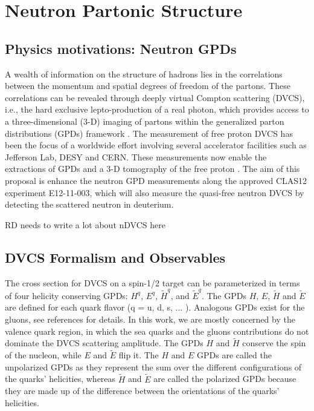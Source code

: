 \chapter{Neutron Partonic Structure}
\label{chap:physics}

\section{Physics motivations: Neutron GPDs}

A wealth of information on the structure of hadrons lies in the correlations 
between the momentum and spatial degrees of freedom of the partons. These 
correlations can be revealed through deeply virtual Compton scattering (DVCS), 
i.e., the hard exclusive lepto-production of a real photon, which provides 
access to a three-dimensional (3-D) imaging of partons within the generalized 
parton distributions (GPDs) framework 
\cite{Mueller:1998fv,PhysRevLett.78.610,PhysRevD.55.7114,Radyushkin:1996nd,PhysRevD.56.5524}.   
The measurement of free proton DVCS has been the focus of a worldwide effort 
\cite{PhysRevLett.87.182002,
   PhysRevLett.87.182001,
   PhysRevD.75.011103,
   Girod:2007aa,
   PhysRevC.92.055202,
   PhysRevLett.99.242501,
   PhysRevC.80.035206,
   PhysRevLett.114.032001,
   Jo:2015ema}
involving several accelerator facilities such as Jefferson Lab, DESY and  
CERN. These measurements now enable the extractions of GPDs and a 3-D 
tomography of the free proton \cite{Guidal:2013rya, PhysRevD.95.011501}. The 
aim of this proposal is enhance the neutron GPD measurements along the approved 
CLAS12 experiment E12-11-003, which will also measure the quasi-free neutron 
DVCS by detecting the scattered neutron in deuterium.  

RD needs to write a lot about nDVCS here

\section{DVCS Formalism and Observables}

The cross section for DVCS on a spin-1/2 target can be parameterized in terms 
of four helicity conserving GPDs: $H^q$, $E^q$, $\tilde{H}^q$, and 
$\tilde{E}^q$. The GPDs $H$, $E$, $\widetilde{H}$ and $\widetilde{E}$ are 
defined for each quark flavor (q = u, d, s, ... ). Analogous GPDs exist for the 
gluons, see references \cite{PhysRevLett.78.610,PhysRevD.56.5524,Goeke:2001tz} for details.  In 
this work, we are mostly concerned by the valence quark region, in which the 
sea quarks and the gluons contributions do not dominate the DVCS scattering 
amplitude. The GPDs $H$ and $\widetilde{H}$ conserve the spin of the nucleon, 
while $E$ and $\widetilde{E}$ flip it. The $H$ and $E$ GPDs are called the 
unpolarized GPDs as they represent the sum over the different configurations of 
the quarks' helicities, whereas $\widetilde{H}$ and $\widetilde{E}$ are called 
the polarized GPDs because they are made up of the difference between the 
orientations of the quarks' helicities.

